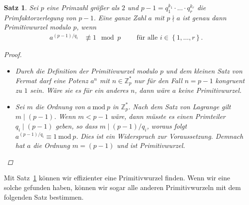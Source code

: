 \documentclass[
  a4paper,
  11pt,
]{scrartcl}
\theoremstyle{plain}
\newtheorem{satz}{Satz}
\theoremstyle{definition}
\theoremstyle{remark}
\newcommand{\Z}{\mathbb{Z}}
\newcommand{\Mod}[1]{\ \mathrm{mod}\ #1}
\begin{document}
\begin{satz}\label{satz:primitivwurzeltest}
  Sei $p$ eine Primzahl größer als $2$ und
  $p-1 = q_1^{k_1} \cdot \ldots \cdot q_r^{k_r}$ die Primfaktorzerlegung von
  $p-1$. Eine ganze Zahl $a$ mit $p \nmid a$ ist genau dann Primitivwurzel
  modulo $p$, wenn
  \begin{align*}
    a^{(p-1)/q_i} & \not\equiv 1 \mod p \qquad \text{ für alle } i \in \left\{1, \ldots, r\right\}.
  \end{align*}

  \begin{proof}
    \begin{itemize}
      \item[„$\Rightarrow$“] Durch die Definition der Primitivwurzel modulo $p$
        und dem kleinen Satz von Fermat darf eine Potenz $a^n$ mit
        $n \in \Z_p^*$ nur für den Fall $n = p-1$ kongruent zu $1$ sein. Wäre
        sie es für ein anderes $n$, dann wäre $a$ keine Primitivwurzel.
      \item[„$\Leftarrow$“] Sei $m$ die Ordnung von $a \Mod{p}$ in $\Z_p^*$.
        Nach dem Satz von Lagrange gilt $m \mid (p-1)$. Wenn $m < p-1$ wäre,
        dann müsste es einen Primteiler $q_i \mid (p-1)$ geben, so dass
        $m \mid (p-1)/q_i$, woraus folgt $a^{(p-1)/q_i} \equiv 1 \Mod{p}$. Dies
        ist ein Widerspruch zur Voraussetzung. Demnach hat $a$ die Ordnung
        $m = (p-1)$ und ist Primitivwurzel.
    \end{itemize}
  \end{proof}
\end{satz}

Mit Satz~\ref{satz:primitivwurzeltest} können wir effizienter eine
Primitivwurzel finden. Wenn wir eine solche gefunden haben, können wir sogar
alle anderen Primitivwurzeln mit dem folgenden Satz bestimmen.
\end{document}
